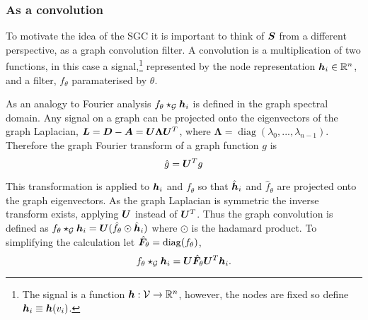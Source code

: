 \subsubsection{As a convolution}
\label{sec:conv}

To motivate the idea of the SGC it is important to think of ${\bm{S}}$ from a different perspective, as a graph convolution filter. A convolution is a multiplication of two functions, in this case a signal,\footnote{The signal is a function ${\bm{h}} : {\mathcal{V}} \to \mathbb{R}^n$, however, the nodes are fixed so define ${\bm{h}}_i \equiv {\bm{h}}(v_i)$.}
represented by the node representation ${\bm{h}}_i \in \mathbb{R}^n$, and a filter, $f_\theta$ paramaterised by $\theta$.

As an analogy to Fourier analysis $f_\theta \star_{\mathcal{G}} {\bm{h}}_i$ is defined in the graph spectral domain.
Any signal on a graph can be projected onto the eigenvectors of the graph Laplacian, ${\bm{L}} = {\bm{D}} - {\bm{A}} = {\bm{U}}\bm{\Lambda}{\bm{U}}^T$, where $\bm{\Lambda} = \operatorname{diag}(\lambda_0, ..., \lambda_{n-1})$.
Therefore the graph Fourier transform of a graph function $g$ is
\begin{equation}
    \hat{g} = {\bm{U}}^Tg
\end{equation}

%


This transformation is applied to ${\bm{h}}_i$ and $f_\theta$ so that $\hat{{\bm{h}}}_i$ and $\hat f_\theta$ are projected onto the graph eigenvectors.
As the graph Laplacian is symmetric the inverse transform exists, applying ${\bm{U}}$ instead of ${\bm{U}}^T$.
Thus the graph convolution is defined as $f_\theta \star_{\mathcal{G}} {\bm{h}}_i = {\bm{U}}(\hat f_\theta \odot \hat{{\bm{h}}}_i)$ where $\odot$ is the hadamard product.
To simplifying the calculation let $\hat{{\bm{F}}}_\theta = \operatorname{diag}(f_\theta)$,
\begin{equation}
    \label{eq:conv}
    f_\theta \star_{\mathcal{G}} {\bm{h}}_i = {\bm{U}}\hat{{\bm{F}}}_\theta{\bm{U}}^T{\bm{h}}_i.
\end{equation}

